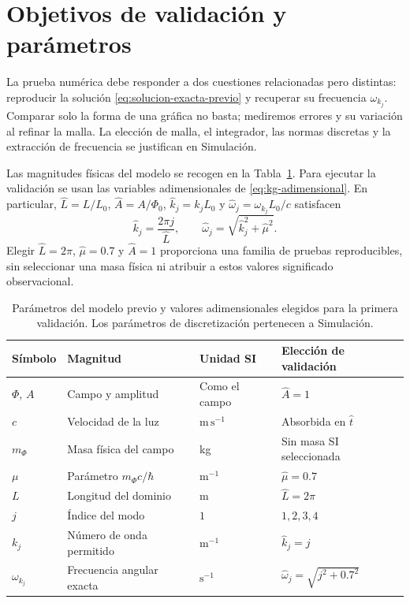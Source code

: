 \section{Objetivos de validación y parámetros}
\label{sec:parametros-previos}

La prueba numérica debe responder a dos cuestiones relacionadas pero distintas:
reproducir la solución \eqref{eq:solucion-exacta-previo} y recuperar su
frecuencia $\omega_{k_j}$. Comparar solo la forma de una gráfica no basta;
mediremos errores y su variación al refinar la malla. La elección de malla,
el integrador, las normas discretas y la extracción de frecuencia se
justifican en Simulación.

Las magnitudes físicas del modelo se recogen en la
Tabla~\ref{tab:parametros-previos}. Para ejecutar la validación se usan
las variables adimensionales de \eqref{eq:kg-adimensional}. En particular,
$\widehat L=L/L_0$, $\widehat A=A/\Phi_0$,
$\widehat k_j=k_jL_0$ y $\widehat\omega_j=\omega_{k_j}L_0/c$ satisfacen
\[
\widehat k_j=\frac{2\pi j}{\widehat L},\qquad
\widehat\omega_j=\sqrt{\widehat k_j^2+\widehat\mu^2}.
\]
Elegir $\widehat L=2\pi$, $\widehat\mu=0.7$ y $\widehat A=1$ proporciona
una familia de pruebas reproducibles, sin seleccionar una masa física ni
atribuir a estos valores significado observacional.

\begin{table}[htbp]
\centering\small
\begin{tabularx}{\textwidth}{@{}lXlX@{}}
\toprule
Símbolo & Magnitud & Unidad SI & Elección de validación \\
\midrule
$\Phi$, $A$ & Campo y amplitud & Como el campo & $\widehat A=1$ \\
$c$ & Velocidad de la luz & $\mathrm{m\,s^{-1}}$ & Absorbida en $\widehat t$ \\
$m_\Phi$ & Masa física del campo & kg & Sin masa SI seleccionada \\
$\mu$ & Parámetro $m_\Phi c/\hbar$ & $\mathrm{m^{-1}}$ & $\widehat\mu=0.7$ \\
$L$ & Longitud del dominio & m & $\widehat L=2\pi$ \\
$j$ & Índice del modo & $1$ & $1,2,3,4$ \\
$k_j$ & Número de onda permitido & $\mathrm{m^{-1}}$ & $\widehat k_j=j$ \\
$\omega_{k_j}$ & Frecuencia angular exacta & $\mathrm{s^{-1}}$ & $\widehat\omega_j=\sqrt{j^2+0.7^2}$ \\
\bottomrule
\end{tabularx}
\caption{Parámetros del modelo previo y valores adimensionales elegidos
para la primera validación. Los parámetros de discretización pertenecen
a Simulación.}
\label{tab:parametros-previos}
\end{table}
